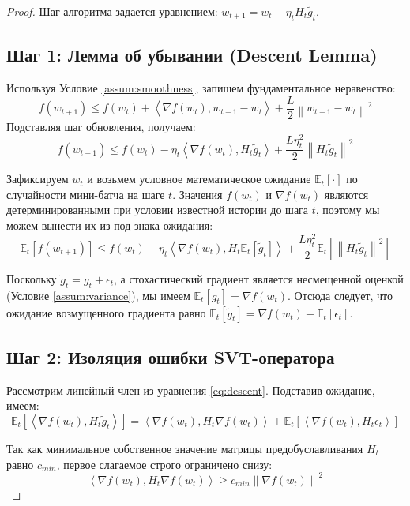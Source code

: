 \documentclass[11pt]{article}
\newcommand{\E}{\mathbb{E}}
\newcommand{\norm}[1]{\left\|#1\right\|}
\newcommand{\inner}[2]{\left\langle #1, #2 \right\rangle}
\begin{document}
\begin{proof}
Шаг алгоритма задается уравнением: $w_{t+1} = w_t - \eta_t H_t \tilde{g}_t$.

\subsection*{Шаг 1: Лемма об убывании (Descent Lemma)}
Используя Условие \ref{assum:smoothness}, запишем фундаментальное неравенство:
\begin{equation}
    f(w_{t+1}) \le f(w_t) + \inner{\nabla f(w_t)}{w_{t+1} - w_t} + \frac{L}{2} \norm{w_{t+1} - w_t}^2
\end{equation}
Подставляя шаг обновления, получаем:
\begin{equation}
\label{eq:descent}
    f(w_{t+1}) \le f(w_t) - \eta_t \inner{\nabla f(w_t)}{H_t \tilde{g}_t} + \frac{L \eta_t^2}{2} \norm{H_t \tilde{g}_t}^2
\end{equation}

Зафиксируем $w_t$ и возьмем условное математическое ожидание $\E_t[\cdot]$ по случайности мини-батча на шаге $t$. Значения $f(w_t)$ и $\nabla f(w_t)$ являются детерминированными при условии известной истории до шага $t$, поэтому мы можем вынести их из-под знака ожидания:
\begin{equation}
    \E_t [f(w_{t+1})] \le f(w_t) - \eta_t \inner{\nabla f(w_t)}{H_t \E_t[\tilde{g}_t]} + \frac{L \eta_t^2}{2} \E_t\left[\norm{H_t \tilde{g}_t}^2\right]
\end{equation}

Поскольку $\tilde{g}_t = g_t + \epsilon_t$, а стохастический градиент является несмещенной оценкой (Условие \ref{assum:variance}), мы имеем $\E_t[g_t] = \nabla f(w_t)$. Отсюда следует, что ожидание возмущенного градиента равно $\E_t[\tilde{g}_t] = \nabla f(w_t) + \E_t[\epsilon_t]$. 

\subsection*{Шаг 2: Изоляция ошибки SVT-оператора}
Рассмотрим линейный член из уравнения \eqref{eq:descent}. Подставив ожидание, имеем:
\begin{equation}
    \E_t[\inner{\nabla f(w_t)}{H_t \tilde{g}_t}] = \inner{\nabla f(w_t)}{H_t \nabla f(w_t)} + \E_t[\inner{\nabla f(w_t)}{H_t \epsilon_t}]
\end{equation}

Так как минимальное собственное значение матрицы предобуславливания $H_t$ равно $c_{min}$, первое слагаемое строго ограничено снизу:
\begin{equation}
    \inner{\nabla f(w_t)}{H_t \nabla f(w_t)} \ge c_{min} \norm{\nabla f(w_t)}^2
\end{equation}


\end{proof}
\end{document}
